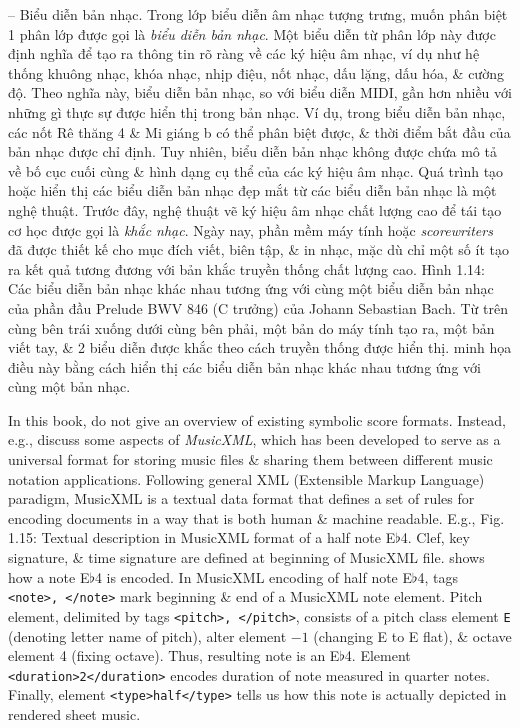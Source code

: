 \documentclass{article}
\begin{document}
\begin{itemize}
\begin{itemize}
\begin{itemize}
			-- {\sf Biểu diễn bản nhạc.} Trong lớp biểu diễn âm nhạc tượng trưng, muốn phân biệt 1 phân lớp được gọi là {\it biểu diễn bản nhạc}. Một biểu diễn từ phân lớp này được định nghĩa để tạo ra thông tin rõ ràng về các ký hiệu âm nhạc, ví dụ như hệ thống khuông nhạc, khóa nhạc, nhịp điệu, nốt nhạc, dấu lặng, dấu hóa, \& cường độ. Theo nghĩa này, biểu diễn bản nhạc, so với biểu diễn MIDI, gần hơn nhiều với những gì thực sự được hiển thị trong bản nhạc. Ví dụ, trong biểu diễn bản nhạc, các nốt Rê thăng 4 \& Mi giáng b có thể phân biệt được, \& thời điểm bắt đầu của bản nhạc được chỉ định. Tuy nhiên, biểu diễn bản nhạc không được chứa mô tả về bố cục cuối cùng \& hình dạng cụ thể của các ký hiệu âm nhạc. Quá trình tạo hoặc hiển thị các biểu diễn bản nhạc đẹp mắt từ các biểu diễn bản nhạc là một nghệ thuật. Trước đây, nghệ thuật vẽ ký hiệu âm nhạc chất lượng cao để tái tạo cơ học được gọi là {\it khắc nhạc}. Ngày nay, phần mềm máy tính hoặc {\it scorewriters} đã được thiết kế cho mục đích viết, biên tập, \& in nhạc, mặc dù chỉ một số ít tạo ra kết quả tương đương với bản khắc truyền thống chất lượng cao. {\sf Hình 1.14: Các biểu diễn bản nhạc khác nhau tương ứng với cùng một biểu diễn bản nhạc của phần đầu Prelude BWV 846 (C trưởng) của {\sc Johann Sebastian Bach}. Từ trên cùng bên trái xuống dưới cùng bên phải, một bản do máy tính tạo ra, một bản viết tay, \& 2 biểu diễn được khắc theo cách truyền thống được hiển thị.} minh họa điều này bằng cách hiển thị các biểu diễn bản nhạc khác nhau tương ứng với cùng một bản nhạc.
			
			In this book, do not give an overview of existing symbolic score formats. Instead, e.g., discuss some aspects of {\it MusicXML}, which has been developed to serve as a universal format for storing music files \& sharing them between different music notation applications. Following general XML (Extensible Markup Language) paradigm, MusicXML is a textual data format that defines a set of rules for encoding documents in a way that is both human \& machine readable. E.g., {\sf Fig. 1.15: Textual description in MusicXML format of a half note E$\flat$4. Clef, key signature, \& time signature are defined at beginning of MusicXML file.} shows how a note E$\flat$4 is encoded. In MusicXML encoding of half note E$\flat$4, tags \verb|<note>, </note>| mark beginning \& end of a MusicXML note element. Pitch element, delimited by tags \verb|<pitch>, </pitch>|, consists of a pitch class element {\tt E} (denoting letter name of pitch), alter element $-1$ (changing E to E flat), \& octave element 4 (fixing octave). Thus, resulting note is an E$\flat$4. Element \verb|<duration>2</duration>| encodes duration of note measured in quarter notes. Finally, element \verb|<type>half</type>| tells us how this note is actually depicted in rendered sheet music.
			

\end{itemize}
\end{itemize}
\end{itemize}
\end{document}
